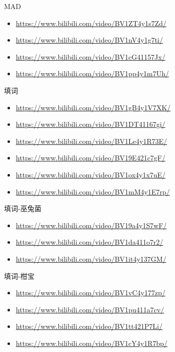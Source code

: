 \documentclass[a4paper]{article}
\begin{document}
MAD

\begin{itemize}
    \item \href{call of silence}{https://www.bilibili.com/video/BV1ZT4y1s7Zd/}
    \item \href{The Herrscher of Origin}{https://www.bilibili.com/video/BV1nV4y1g7ti/}
    \item \href{手书 Roads to Ride}{https://www.bilibili.com/video/BV1cG41157Jx/}
    \item \href{Evangel 星海余音 LAST STARDUST}{https://www.bilibili.com/video/BV1pp4y1m7Uh/}
\end{itemize}

填词

\begin{itemize}
    \item \href{TruE 中文填词}{https://www.bilibili.com/video/BV1gB4y1V7XK/}
    \item \href{花}{https://www.bilibili.com/video/BV1DT41167gi/}
    \item \href{错位时空}{https://www.bilibili.com/video/BV1Le4y1R73E/}
    \item \href{暮色回响}{https://www.bilibili.com/video/BV19E421c7gF/}
    \item \href{神啊 暮色回响}{https://www.bilibili.com/video/BV1ox4y1x7uE/}
    \item \href{爱酱在等你}{https://www.bilibili.com/video/BV1mM4y1E7rp/}
\end{itemize}

填词-巫兔菌

\begin{itemize}
    \item \href{不问别离}{https://www.bilibili.com/video/BV19a4y1S7wF/}
    \item \href{无瑕少女}{https://www.bilibili.com/video/BV1da411o7r2/}
    \item \href{水晶花的葬礼}{https://www.bilibili.com/video/BV1it4y137GM/}
\end{itemize}

填词-柑宝

\begin{itemize}
    \item \href{别让我担心}{https://www.bilibili.com/video/BV1vC4y177zp/}
    \item \href{她们本该如此浪漫的活着}{https://www.bilibili.com/video/BV1pu411a7cv/}
    \item \href{稻香}{https://www.bilibili.com/video/BV1tt421P7Li/}
    \item \href{二十七位女武神的告白}{https://www.bilibili.com/video/BV1cY4y1R7bp/}
\end{itemize}
\end{document}
